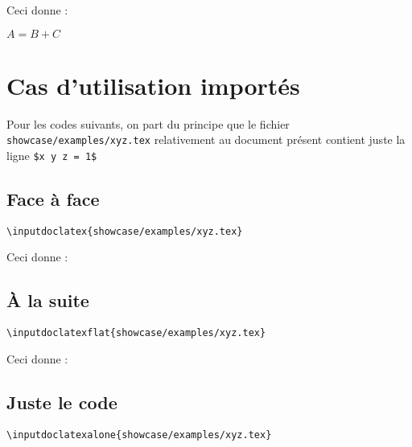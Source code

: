 Ceci donne :

\begin{doclatex-alone}
	$A = B + C$
\end{doclatex-alone}




\section{Cas d'utilisation importés}

Pour les codes suivants, on part du principe que le fichier \verb+showcase/examples/xyz.tex+ relativement au document présent contient juste la ligne \verb+$x y z = 1$+

\subsection{Face à face}

\begin{tcolorbox}  %
\begin{verbatim}
\inputdoclatex{showcase/examples/xyz.tex}
\end{verbatim}
\end{tcolorbox}    %

Ceci donne :





\subsection{À la suite}

\begin{tcolorbox}  %
\begin{verbatim}
\inputdoclatexflat{showcase/examples/xyz.tex}
\end{verbatim}
\end{tcolorbox}    %

Ceci donne :





\subsection{Juste le code}

\begin{tcolorbox}  %
\begin{verbatim}
\inputdoclatexalone{showcase/examples/xyz.tex}
\end{verbatim}
\end{tcolorbox}    %

